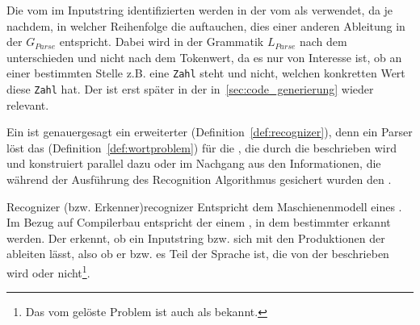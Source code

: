 Die vom  im Inputstring identifizierten  werden in der  vom  als  verwendet, da je nachdem, in welcher Reihenfolge die  auftauchen, dies einer anderen Ableitung in der  $G_{Parse}$ entspricht. Dabei wird in der Grammatik $L_{Parse}$ nach dem  unterschieden und nicht nach dem Tokenwert, da es nur von Interesse ist, ob an einer bestimmten Stelle z.B. eine \verb|Zahl| steht und nicht, welchen konkretten Wert diese \verb|Zahl| hat. Der  ist erst später in der  in~\ref{sec:code_generierung} wieder relevant.

Ein  ist genauergesagt ein erweiterter  (Definition~\ref{def:recognizer}), denn ein Parser löst das  (Definition~\ref{def:wortproblem}) für die , die durch die  beschrieben wird und konstruiert parallel dazu oder im Nachgang aus den Informationen, die während der Ausführung des Recognition Algorithmus gesichert wurden den .

\begin{Definition}{Recognizer (bzw. Erkenner)}{recognizer}
  Entspricht dem Maschienenmodell eines . Im Bezug auf Compilerbau entspricht der  einem , in dem  bestimmter  erkannt werden. Der  erkennt, ob ein Inputstring bzw.  sich mit den Produktionen der  ableiten lässt, also ob er bzw. es Teil der Sprache ist, die von der  beschrieben wird oder nicht\footnote{Das vom  gelöste Problem ist auch als  bekannt.}.
\end{Definition}

